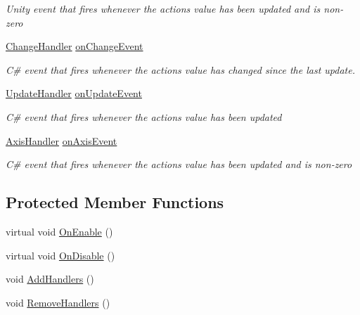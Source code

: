 \begin{DoxyCompactItemize}
\begin{DoxyCompactList}\small\item\em Unity event that fires whenever the action\textquotesingle{}s value has been updated and is non-\/zero \end{DoxyCompactList}\item 
\mbox{\hyperlink{class_valve_1_1_v_r_1_1_steam_v_r___behaviour___vector3_acbfc7493b7f3400ae86a1dc7a1d8eebd}{Change\+Handler}} \mbox{\hyperlink{class_valve_1_1_v_r_1_1_steam_v_r___behaviour___vector3_ad0b0327bca19ec390c75a9e8f6170227}{on\+Change\+Event}}
\begin{DoxyCompactList}\small\item\em C\# event that fires whenever the action\textquotesingle{}s value has changed since the last update. \end{DoxyCompactList}\item 
\mbox{\hyperlink{class_valve_1_1_v_r_1_1_steam_v_r___behaviour___vector3_ad7c9905e6f1e489e71bf1a8f5a3cb4ec}{Update\+Handler}} \mbox{\hyperlink{class_valve_1_1_v_r_1_1_steam_v_r___behaviour___vector3_aa6d221ebee93b689cf325c6ecd3440bb}{on\+Update\+Event}}
\begin{DoxyCompactList}\small\item\em C\# event that fires whenever the action\textquotesingle{}s value has been updated \end{DoxyCompactList}\item 
\mbox{\hyperlink{class_valve_1_1_v_r_1_1_steam_v_r___behaviour___vector3_a6599185cabefcb861406669fdb78ce8a}{Axis\+Handler}} \mbox{\hyperlink{class_valve_1_1_v_r_1_1_steam_v_r___behaviour___vector3_a71032989f53d8b8bcb8c496790c8c124}{on\+Axis\+Event}}
\begin{DoxyCompactList}\small\item\em C\# event that fires whenever the action\textquotesingle{}s value has been updated and is non-\/zero \end{DoxyCompactList}\end{DoxyCompactItemize}
\subsection*{Protected Member Functions}
\begin{DoxyCompactItemize}
\item 
virtual void \mbox{\hyperlink{class_valve_1_1_v_r_1_1_steam_v_r___behaviour___vector3_ae448226b18a44152fdc5c1db0652423d}{On\+Enable}} ()
\item 
virtual void \mbox{\hyperlink{class_valve_1_1_v_r_1_1_steam_v_r___behaviour___vector3_a32e697139f8cc49fdda33df312f16117}{On\+Disable}} ()
\item 
void \mbox{\hyperlink{class_valve_1_1_v_r_1_1_steam_v_r___behaviour___vector3_ad7d4531c55b5043582a7a7f945f12144}{Add\+Handlers}} ()
\item 
void \mbox{\hyperlink{class_valve_1_1_v_r_1_1_steam_v_r___behaviour___vector3_a3c5518834ec1d2fd66991adb0be37a73}{Remove\+Handlers}} ()
\end{DoxyCompactItemize}
